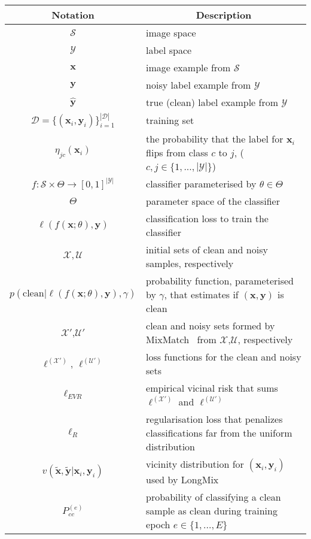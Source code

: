 \documentclass[review]{elsarticle}
\begin{document}
\begin{table}[ht]
\centering
\scriptsize
\begin{tabular}{|c|l|}
\hline
\multicolumn{1}{|c|}{Notation}& \multicolumn{1}{c|}{Description}\\
\hline\hline
$\mathcal{S}$ & image space \\
$\mathcal{Y}$ & label space \\
$\mathbf{x}$ &  image example from $\mathcal{S}$ \\
$\mathbf{y}$ &  noisy label example from $\mathcal{Y}$ \\
$\hat{\mathbf{y}}$ & true (clean) label example from $\mathcal{Y}$ \\
$\mathcal{D}=\{(\mathbf{x}_i, \mathbf{y}_i)\}_{i=1}^{|\mathcal{D}|}$ & training set \\
$\eta_{jc}(\mathbf{x}_i)$ & the probability that the label for $\mathbf{x}_i$ flips from class $c$ to $j$, ($c,j \in \{1,...,|\mathcal{Y}|\}$)\\
$f:\mathcal{S} \times \Theta \to [0,1]^{|\mathcal{Y}|}$ & classifier parameterised by $\theta \in \Theta$\\
$\Theta$ & parameter space of the classifier\\
$\ell(f(\mathbf{x};\theta),\mathbf{y})$ & classification loss to train the classifier \\
$\mathcal{X},\mathcal{U}$ & initial sets of clean and noisy samples, respectively \\
$p \left ( \text{clean} | \ell( f(\mathbf{x};\theta),\mathbf{y}) , \gamma \right )$ & probability function, parameterised by $\gamma$, that estimates if $(\mathbf{x},\mathbf{y})$ is clean \\
$\mathcal{X}'$,$\mathcal{U}'$ & clean and noisy sets formed by MixMatch~\cite{berthelot2019mixmatch} from $\mathcal{X}$,$\mathcal{U}$, respectively\\
$\ell^{(\mathcal{X}')}$, $\ell^{(\mathcal{U}')}$ & loss functions for the clean and noisy sets \\
$\ell_{EVR}$ & empirical vicinal risk that sums $\ell^{(\mathcal{X}')}$ and $\ell^{(\mathcal{U}')}$ \\
$\ell_{R}$ & regularisation loss that penalizes classifications far from the uniform distribution \\
$v(\tilde{\mathbf{x}},\tilde{\mathbf{y}}|\mathbf{x}_i,\mathbf{y}_i)$ & vicinity distribution for $(\mathbf{x}_i,\mathbf{y}_i)$ used by LongMix\\
$P_{cc}^{(e)}$ & probability of classifying a clean sample as clean during training epoch $e \in \{1,...,E\}$\\

\end{tabular}
\end{table}
\end{document}
